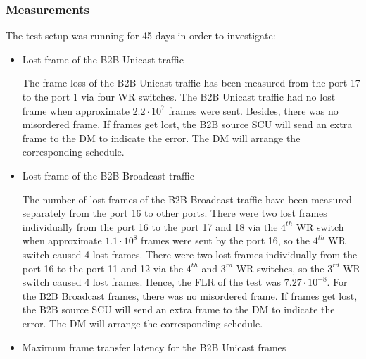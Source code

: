 \subsubsection{Measurements}
The test setup was running for 45 days in order to investigate: 
\begin{itemize}
    \item Lost frame of the B2B Unicast traffic

The frame loss of the B2B Unicast traffic has been measured from the port 17 to the port 1 via four WR switches. The B2B Unicast traffic had no lost frame when approximate $2.2\cdot 10^{7}$ frames were sent. Besides, there was no misordered frame. If frames get lost, the B2B source SCU will send an extra frame to the DM to indicate the error. The DM will arrange the corresponding schedule.

    \item Lost frame of the B2B Broadcast traffic

 


The number of lost frames of the B2B Broadcast traffic have been measured separately from the port 16 to other ports. There were two lost frames individually from the port 16 to the port 17 and 18 via the $4^{th}$ WR switch when approximate $1.1\cdot 10^{8}$ frames were sent by the port 16, so the $4^{th}$ WR switch caused 4 lost frames. There were two lost frames individually from the port 16 to the port 11 and 12 via the $4^{th}$ and $3^{rd}$ WR switches, so the $3^{rd}$ WR switch caused 4 lost frames. Hence, the FLR of the test was $7.27\cdot 10^{-8}$. For the B2B Broadcast frames, there was no misordered frame. If frames get lost, the B2B source SCU will send an extra frame to the DM to indicate the error. The DM will arrange the corresponding schedule.



    \item Maximum frame transfer latency for the B2B Unicast frames


\end{itemize}
